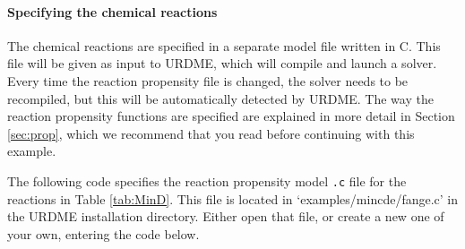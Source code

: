 \paragraph*{Specifying the chemical reactions}

The chemical reactions are specified in a separate model file written
in C. This file will be given as input to URDME, which will compile
and launch a solver. Every time the reaction propensity file is
changed, the solver needs to be recompiled, but this will be
automatically detected by URDME.  The way the reaction propensity
functions are specified are explained in more detail in Section
\ref{sec:prop}, which we recommend that you read before continuing
with this example.

The following code specifies the reaction propensity model \texttt{.c}
file for the reactions in Table \ref{tab:MinD}. This file is located
in `examples/mincde/fange.c' in the URDME installation
directory. Either open that file, or create a new one of your own,
entering the code below.




